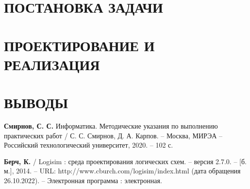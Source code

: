 \documentclass{mirea}
\author     {Фамилия И.O.}
\begin{document}
\chapter{ПОСТАНОВКА ЗАДАЧИ}
\chapter{ПРОЕКТИРОВАНИЕ И РЕАЛИЗАЦИЯ}
\chapter{ВЫВОДЫ}

\begin{thebibliography}{99}
	 \textbf{Смирнов, С. С.} Информатика. Методические указания по выполнению практических работ / С. С. Смирнов, Д. А. Карпов. – Москва, МИРЭА – Российский технологический университет, 2020. – 102 с.
	
	 \textbf{Берч, К.} / Logisim : среда проектирования логических схем. -- версия 2.7.0. -- [б. м.], 2014. -- URL: http://www.cburch.com/logisim/index.html (дата обращения 26.10.2022). -- Электронная программа : электронная.
\end{thebibliography}
\end{document}
